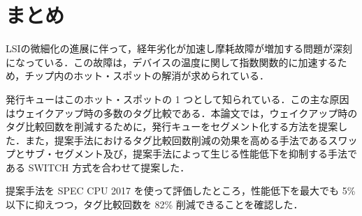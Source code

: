 
\chapter{まとめ}
\label{sec:summary}
LSIの微細化の進展に伴って，経年劣化が加速し摩耗故障が増加する問題が深刻になっている．この故障は，デバイスの温度に関して指数関数的に加速するため，チップ内のホット・スポットの解消が求められている．

発行キューはこのホット・スポットの 1 つとして知られている．この主な原因はウェイクアップ時の多数のタグ比較である．本論文では，ウェイクアップ時のタグ比較回数を削減するために，発行キューをセグメント化する方法を提案した．また，提案手法におけるタグ比較回数削減の効果を高める手法であるスワップとサブ・セグメント及び，提案手法によって生じる性能低下を抑制する手法である SWITCH 方式を合わせて提案した．

提案手法を SPEC CPU 2017 を使って評価したところ，性能低下を最大でも 5\% 以下に抑えつつ，タグ比較回数を 82\% 削減できることを確認した．
